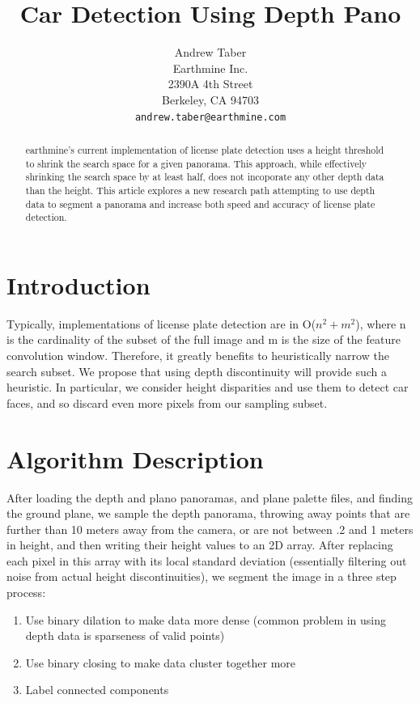 \documentclass{article}
\title{Car Detection Using Depth Pano}
\author{
Andrew Taber \\
Earthmine Inc.\\
2390A 4th Street\\
Berkeley, CA 94703 \\
\texttt{andrew.taber@earthmine.com} \\
}
\begin{document}
\maketitle

\begin{abstract}
earthmine's current implementation of license plate detection uses a height threshold to shrink the 
search space for a given panorama. This approach, while effectively shrinking the search space by at least 
half, does not incoporate any other depth data than the height. This article explores a new research path
attempting to use depth data to segment a panorama and increase both speed and accuracy of license plate
detection.
\end{abstract}

\section{Introduction}
Typically, implementations of license plate detection are in O($n^2 + m^2$), where n is the 
cardinality of the subset of the full image and m is the size of the feature convolution window. 
Therefore, it greatly benefits to heuristically narrow the search subset. We propose that using
depth discontinuity will provide such a heuristic. In particular, we consider height disparities
and use them to detect car faces, and so discard even more pixels from our sampling subset. 

\section{Algorithm Description}
After loading the depth and plano panoramas, and plane palette files, and finding the ground plane, we sample
the depth panorama, throwing away points that are further than 10 meters away from the camera, or are not between
.2 and 1 meters in height, and then writing their height values to an 2D array. After replacing each pixel in this 
array with its local standard deviation (essentially filtering out noise from actual height discontinuities), 
we segment the image in a three step process:

\begin{enumerate}
\item Use binary dilation to make data more dense (common problem in using depth data is sparseness of valid points)
\item Use binary closing to make data cluster together more
\item Label connected components
\end{enumerate}
\end{document}
